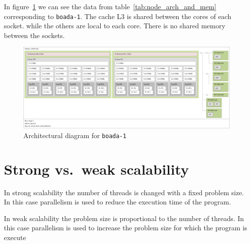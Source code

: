 In figure~\ref{fig:arch_boada1} we can see the data from table~\ref{tab:node_arch_and_mem} corresponding
to \texttt{boada-1}. The cache L3 is shared between the cores of each socket.
 while the others are local to each core. There is no shared memory between the sockets.

\begin{figure}[H]%
    \centering
    \includegraphics[width=\textwidth]{./data/map-boada-1.pdf}
    \caption{Architectural diagram for \texttt{boada-1}}%
    \label{fig:arch_boada1}
\end{figure}


\section{Strong vs.\ weak scalability}%
\label{sec:strong_vs_weak_scalability}


In strong scalability  the  number  of  threads  is  changed  with  a  fixed  problem  size.   In  this  case parallelism is used to reduce the execution time of the program.

In weak scalability the problem size is proportional to the number of threads. In this case parallelism is used to increase the problem size for which the program is execute

